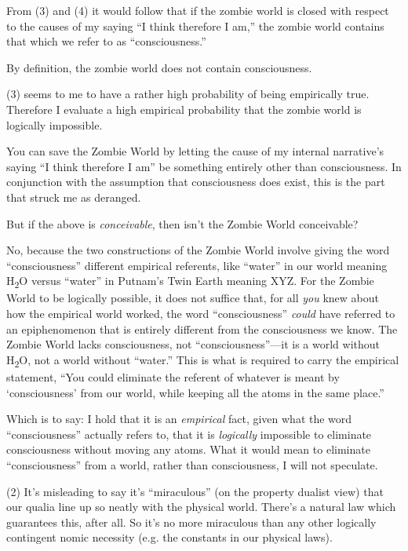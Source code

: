 {
 From (3) and (4) it would follow that if the zombie world is
closed with respect to the causes of my saying ``I
think therefore I am,'' the zombie world contains
that which we refer to as
``consciousness.''}

{
 By definition, the zombie world does not contain consciousness.}

{
 (3) seems to me to have a rather high probability of being
empirically true. Therefore I evaluate a high empirical probability
that the zombie world is logically impossible.}

{
 You can save the Zombie World by letting the cause of my internal
narrative's saying ``I think therefore
I am'' be something entirely other than
consciousness. In conjunction with the assumption that consciousness
does exist, this is the part that struck me as deranged.}

{
 But if the above is \textit{conceivable}, then
isn't the Zombie World conceivable?}

{
 No, because the two constructions of the Zombie World involve
giving the word ``consciousness''
different empirical referents, like
``water'' in our world meaning
H\textsubscript{2}O versus ``water''
in Putnam's Twin Earth meaning XYZ. For the Zombie
World to be logically possible, it does not suffice that, for all
\textit{you} knew about how the empirical world worked, the word
``consciousness'' \textit{could}
have referred to an epiphenomenon that is entirely different from the
consciousness we know. The Zombie World lacks consciousness, not
``consciousness''---it is a world
without H\textsubscript{2}O, not a world without
``water.'' This is what is required
to carry the empirical statement, ``You could
eliminate the referent of whatever is meant by
`consciousness' from our world, while
keeping all the atoms in the same place.''}

{
 Which is to say: I hold that it is an \textit{empirical} fact,
given what the word
``consciousness'' actually refers
to, that it is \textit{logically} impossible to eliminate consciousness
without moving any atoms. What it would mean to eliminate
``consciousness'' from a world,
rather than consciousness, I will not speculate.}

{
 (2) It's misleading to say it's
``miraculous'' (on the property
dualist view) that our qualia line up so neatly with the physical
world. There's a natural law which guarantees this,
after all. So it's no more miraculous than any other
logically contingent nomic necessity (e.g. the constants in our
physical laws).}

